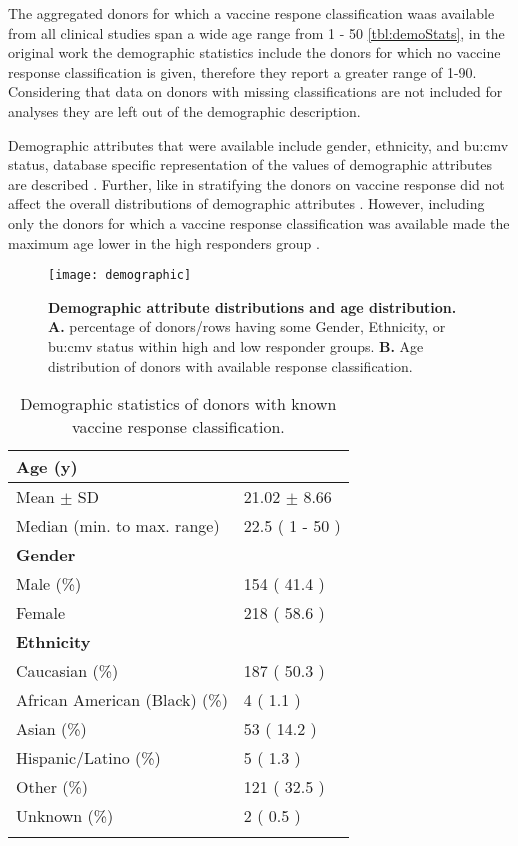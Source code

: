 The aggregated donors for which a vaccine respone classification waas available from all clinical studies span a wide age range  from 1 - 50 \autoref{tbl:demoStats}, in the original work the demographic statistics include the donors for which no vaccine response classification is given, therefore they report a greater range of 1-90.
Considering that data on donors with missing classifications are not included for analyses they are left out of the demographic description.

Demographic attributes that were available include gender, ethnicity, and \gls{bu:cmv} status, database specific representation of the values of demographic attributes are described \dpaper.
Further, like in \dpaper stratifying the donors on vaccine response did not affect the overall distributions of demographic attributes .
However, including only the donors for which a vaccine response classification was available made the maximum age lower in the high responders group .

\begin{figure}[htpb]
    \texttt{[image: demographic]}
    \caption{
        \textbf{Demographic attribute distributions and age distribution.}
        \textbf{A.} percentage of donors/rows having some Gender, Ethnicity, or \gls{bu:cmv} status within high and low responder groups.
        \textbf{B.} Age distribution of donors with available response classification.
    }\label{fig:demoGraph}
\end{figure}



\begin{table}[htpb]
\centering
\begin{tabular}{ll}
\toprule
\textbf{Age (y)} & \\
\midrule
Mean $\pm$ SD & 21.02 $\pm$ 8.66\\
Median (min. to max. range) & 22.5  ( 1 - 50 )\\
\addlinespace
    \textbf{Gender} & \\
\midrule
Male (\%) & 154 ( 41.4 )\\
Female & 218  ( 58.6 )\\
\addlinespace
    \textbf{Ethnicity} & \\
\midrule
Caucasian (\%) & 187 ( 50.3 )\\
African American (Black) (\%) & 4  ( 1.1 )\\
Asian (\%) & 53  ( 14.2 )\\
Hispanic/Latino (\%) & 5  ( 1.3 )\\
Other (\%) & 121  ( 32.5 )\\
Unknown (\%) & 2  ( 0.5 )\\
\bottomrule{}
\end{tabular}
\caption{Demographic statistics of donors with known vaccine response classification.}\label{tbl:demoStats}
\end{table}

